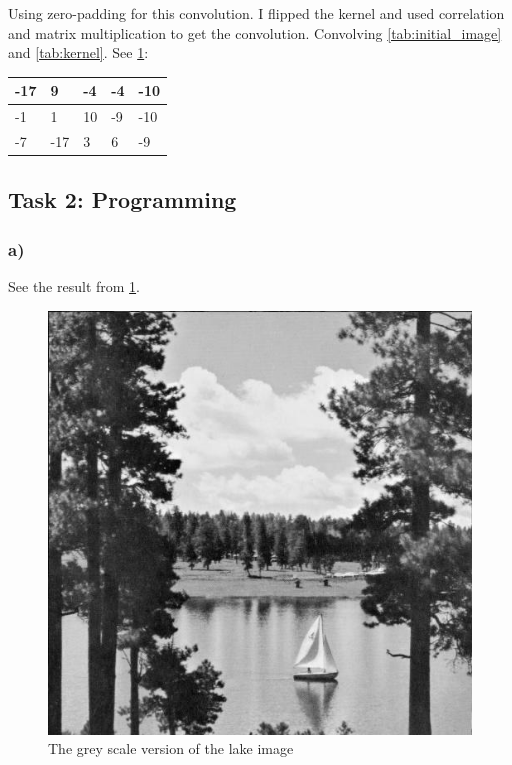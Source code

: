 Using zero-padding for this convolution. I flipped the kernel and used correlation and matrix multiplication to get the convolution. Convolving \cref{tab:initial_image} and \cref{tab:kernel}. See \cref{tab:kernel_convolution}: 
\begin{table}[]
    \label{tab:kernel_convolution}
    \begin{tabular}{|l|l|l|l|l|}
        \hline
        -17 & 9 & -4 & -4 & -10 \\ \hline
        -1 & 1 & 10 & -9 & -10 \\ \hline 
        -7 & -17 & 3 & 6 & -9 \\ \hline
    \end{tabular} 
\end{table}

\newpage
\subsection{Task 2: Programming}
\subsubsection*{a)}
See the result from \cref{fig:greyscale}. 
\begin{figure}[]
    \centering
    \includegraphics[width=1.00\textwidth]{figures/image_processed/lake_greyscale.jpg}
    \caption{The grey scale version of the lake image}
    \label{fig:greyscale}
\end{figure}

